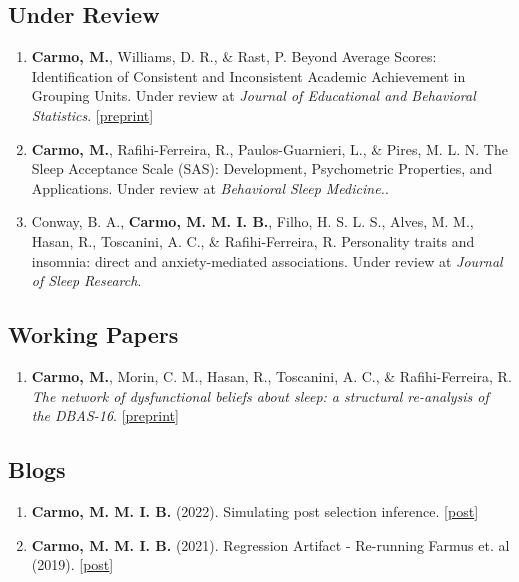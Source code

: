 \documentclass[10pt,]{article}
\providecommand{\tightlist}{%
  \setlength{\itemsep}{0pt}\setlength{\parskip}{0pt}}
\begin{document}
\subsection{\texorpdfstring{\textbf{Under
Review}}{Under Review}}\label{under-review}

\begin{enumerate}
\def\labelenumi{\arabic{enumi}.}
\item
  \textbf{Carmo, M.}, Williams, D. R., \& Rast, P. Beyond Average
  Scores: Identification of Consistent and Inconsistent Academic
  Achievement in Grouping Units. Under review at \emph{Journal of
  Educational and Behavioral Statistics}.
  {[}\href{https://doi.org/10.31234/osf.io/sh6ne}{preprint}{]}
\item
  \textbf{Carmo, M.}, Rafihi-Ferreira, R., Paulos-Guarnieri, L., \&
  Pires, M. L. N. The Sleep Acceptance Scale (SAS): Development,
  Psychometric Properties, and Applications. Under review at
  \emph{Behavioral Sleep Medicine.}.
\item
  Conway, B. A., \textbf{Carmo, M. M. I. B.}, Filho, H. S. L. S., Alves,
  M. M., Hasan, R., Toscanini, A. C., \& Rafihi-Ferreira, R. Personality
  traits and insomnia: direct and anxiety-mediated associations. Under
  review at \emph{Journal of Sleep Research}.
\end{enumerate}

\subsection{\texorpdfstring{\textbf{Working
Papers}}{Working Papers}}\label{working-papers}

\begin{enumerate}
\def\labelenumi{\arabic{enumi}.}
\tightlist
\item
  \textbf{Carmo, M.}, Morin, C. M., Hasan, R., Toscanini, A. C., \&
  Rafihi-Ferreira, R. \emph{The network of dysfunctional beliefs about
  sleep: a structural re-analysis of the DBAS-16}.
  {[}\href{https://osf.io/preprints/psyarxiv/6vuf3}{preprint}{]}
\end{enumerate}

\subsection{\texorpdfstring{\textbf{Blogs}}{Blogs}}\label{blogs}

\begin{enumerate}
\def\labelenumi{\arabic{enumi}.}
\item
  \textbf{Carmo, M. M. I. B.} (2022). Simulating post selection
  inference.
  {[}\href{https://marwincarmo.github.io/posts/2021-12-20-model-selection-bias/}{post}{]}
\item
  \textbf{Carmo, M. M. I. B.} (2021). Regression Artifact - Re-running
  Farmus et. al (2019).
  {[}\href{https://marwincarmo.github.io/posts/2021-11-04-simulating-regression-artifact/}{post}{]}
\end{enumerate}
\end{document}
